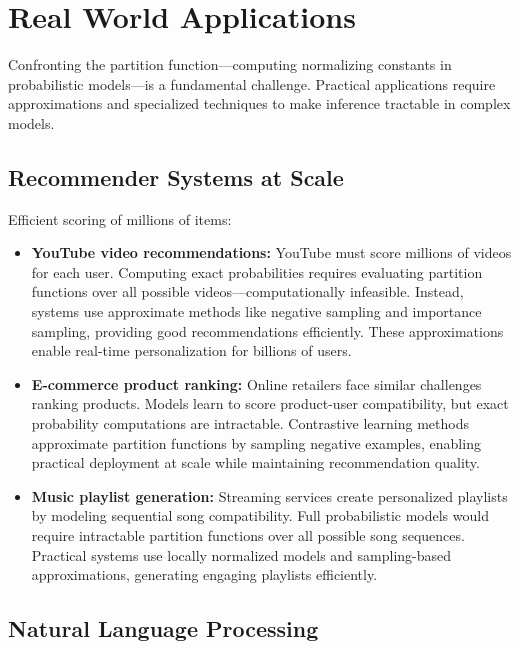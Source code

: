 
\section{Real World Applications}
\label{sec:partition-real-world}

Confronting the partition function—computing normalizing constants in probabilistic models—is a fundamental challenge. Practical applications require approximations and specialized techniques to make inference tractable in complex models.

\subsection{Recommender Systems at Scale}

Efficient scoring of millions of items:

\begin{itemize}
    \item \textbf{YouTube video recommendations:} YouTube must score millions of videos for each user. Computing exact probabilities requires evaluating partition functions over all possible videos—computationally infeasible. Instead, systems use approximate methods like negative sampling and importance sampling, providing good recommendations efficiently. These approximations enable real-time personalization for billions of users.
    
    \item \textbf{E-commerce product ranking:} Online retailers face similar challenges ranking products. Models learn to score product-user compatibility, but exact probability computations are intractable. Contrastive learning methods approximate partition functions by sampling negative examples, enabling practical deployment at scale while maintaining recommendation quality.
    
    \item \textbf{Music playlist generation:} Streaming services create personalized playlists by modeling sequential song compatibility. Full probabilistic models would require intractable partition functions over all possible song sequences. Practical systems use locally normalized models and sampling-based approximations, generating engaging playlists efficiently.
\end{itemize}

\subsection{Natural Language Processing}

